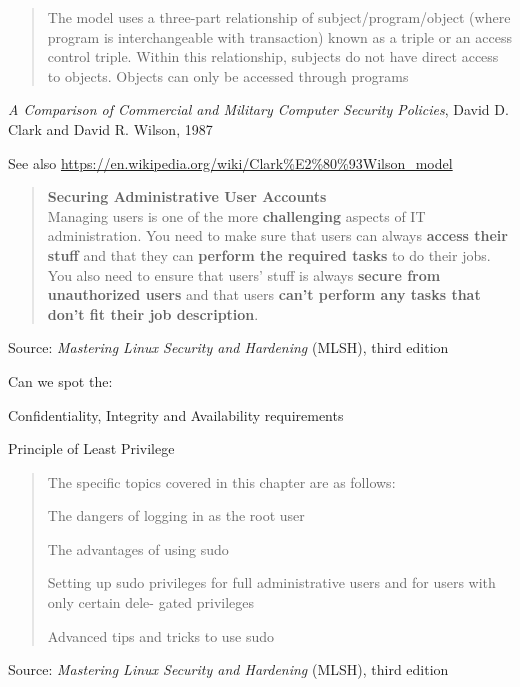 \documentclass[Screen16to9,17pt]{foils}
\begin{document}

\begin{quote}
The model uses a three-part relationship of subject/program/object (where program is interchangeable with transaction) known as a triple or an access control triple. Within this relationship, subjects do not have direct access to objects. Objects can only be accessed through programs
\end{quote}

\emph{A Comparison of Commercial and Military Computer Security Policies},
David D. Clark and David R. Wilson, 1987


See also
\url{https://en.wikipedia.org/wiki/Clark%E2%80%93Wilson_model}




\begin{quote}{\bf
Securing Administrative User Accounts}\\
Managing users is one of the more {\bf challenging} aspects of IT administration. You need to make sure
that users can always {\bf access their stuff} and that they can {\bf perform the required tasks} to do their jobs.
You also need to ensure that users’ stuff is always {\bf secure from unauthorized users} and that users  {\bf can’t perform any tasks that don’t fit their job description}.
\end{quote}
Source: \emph{Mastering Linux Security and Hardening} (MLSH), third edition

Can we spot the:
\begin{list2}
\item Confidentiality, Integrity and Availability requirements
\item Principle of Least Privilege
\end{list2}


\begin{quote}

The specific topics covered in this chapter are as follows:
\begin{list2}
\item The dangers of logging in as the root user
\item The advantages of using sudo
\item Setting up sudo privileges for full administrative users and for users with only certain dele-
gated privileges
\item Advanced tips and tricks to use sudo
\end{list2}
\end{quote}
Source: \emph{Mastering Linux Security and Hardening} (MLSH), third edition
\end{document}
